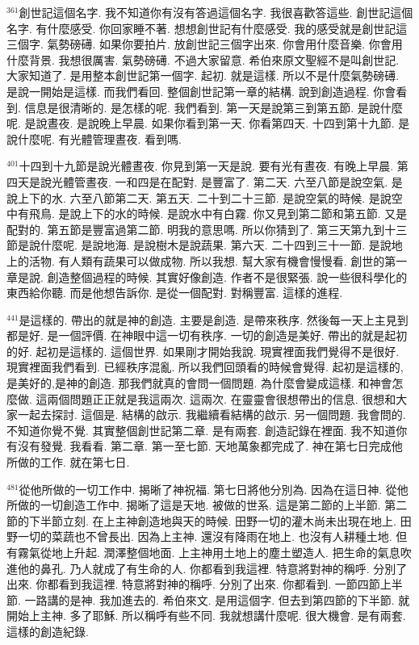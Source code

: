 \documentclass{book}
\begin{document}
$^{361}$創世記這個名字.
我不知道你有沒有答過這個名字.
我很喜歡答這些.
創世記這個名字.
有什麼感受.
你回家睡不著.
想想創世記有什麼感受.
我的感受就是創世記這三個字.
氣勢磅礡.
如果你要拍片.
放創世記三個字出來.
你會用什麼音樂.
你會用什麼背景.
我想很厲害.
氣勢磅礡.
不過大家留意.
希伯來原文聖經不是叫創世記.
大家知道了.
是用整本創世記第一個字.
起初.
就是這樣.
所以不是什麼氣勢磅礡.
是說一開始是這樣.
而我們看回.
整個創世記第一章的結構.
說到創造過程.
你會看到.
信息是很清晰的.
是怎樣的呢.
我們看到.
第一天是說第三到第五節.
是說什麼呢.
是說晝夜.
是說晚上早晨.
如果你看到第一天.
你看第四天.
十四到第十九節.
是說什麼呢.
有光體管理晝夜.
看到嗎.

$^{401}$十四到十九節是說光體晝夜.
你見到第一天是說.
要有光有晝夜.
有晚上早晨.
第四天是說光體管晝夜.
一和四是在配對.
是豐富了.
第二天.
六至八節是說空氣.
是說上下的水.
六至八節第二天.
第五天.
二十到二十三節.
是說空氣的時候.
是說空中有飛鳥.
是說上下的水的時候.
是說水中有白霧.
你又見到第二節和第五節.
又是配對的.
第五節是豐富過第二節.
明我的意思嗎.
所以你猜到了.
第三天第九到十三節是說什麼呢.
是說地海.
是說樹木是說蔬果.
第六天.
二十四到三十一節.
是說地上的活物.
有人類有蔬果可以做成物.
所以我想.
幫大家有機會慢慢看.
創世的第一章是說.
創造整個過程的時候.
其實好像創造.
作者不是很緊張.
說一些很科學化的東西給你聽.
而是他想告訴你.
是從一個配對.
對稱豐富.
這樣的進程.

$^{441}$是這樣的.
帶出的就是神的創造.
主要是創造.
是帶來秩序.
然後每一天上主見到都是好.
是一個評價.
在神眼中這一切有秩序.
一切的創造是美好.
帶出的就是起初的好.
起初是這樣的.
這個世界.
如果剛才開始我說.
現實裡面我們覺得不是很好.
現實裡面我們看到.
已經秩序混亂.
所以我們回頭看的時候會覺得.
起初是這樣的,是美好的,是神的創造.
那我們就真的會問一個問題.
為什麼會變成這樣.
和神會怎麼做.
這兩個問題正正就是我這兩次.
這兩次.
在靈靈會很想帶出的信息.
很想和大家一起去探討.
這個是.
結構的啟示.
我繼續看結構的啟示.
另一個問題.
我會問的.
不知道你覺不覺.
其實整個創世記第二章.
是有兩套.
創造記錄在裡面.
我不知道你有沒有發覺.
我看看.
第二章.
第一至七節.
天地萬象都完成了.
神在第七日完成他所做的工作.
就在第七日.

$^{481}$從他所做的一切工作中.
揭晰了神祝福.
第七日將他分別為.
因為在這日神.
從他所做的一切創造工作中.
揭晰了這是天地.
被做的世系.
這是第二節的上半節.
第二節的下半節立刻.
在上主神創造地與天的時候.
田野一切的灌木尚未出現在地上.
田野一切的菜蔬也不曾長出.
因為上主神.
還沒有降雨在地上.
也沒有人耕種土地.
但有霧氣從地上升起.
潤澤整個地面.
上主神用土地上的塵土塑造人.
把生命的氣息吹進他的鼻孔.
乃人就成了有生命的人.
你都看到我這裡.
特意將對神的稱呼.
分別了出來.
你都看到我這裡.
特意將對神的稱呼.
分別了出來.
你都看到.
一節四節上半節.
一路講的是神.
我加進去的.
希伯來文.
是用這個字.
但去到第四節的下半節.
就開始上主神.
多了耶穌.
所以稱呼有些不同.
我就想講什麼呢.
很大機會.
是有兩套.
這樣的創造紀錄.
\end{document}
